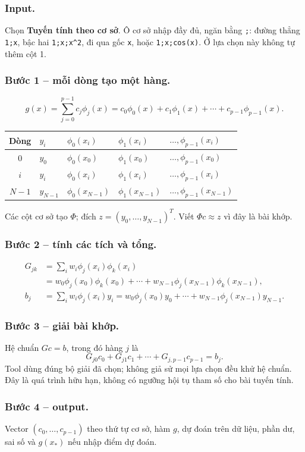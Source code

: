 \subsubsection*{Input.} Chọn \textbf{Tuyến tính theo cơ sở}. Ô cơ sở nhập đầy đủ, ngăn bằng \texttt{;}: đường thẳng \texttt{1;x}, bậc hai \texttt{1;x;x\^{}2}, đi qua gốc \texttt{x}, hoặc \texttt{1;x;cos(x)}. Ở lựa chọn này không tự thêm cột 1.
\subsubsection*{Bước 1 -- mỗi dòng tạo một hàng.}
\[
g(x)=\sum_{j=0}^{p-1}c_j\phi_j(x)=c_0\phi_0(x)+c_1\phi_1(x)+\cdots+c_{p-1}\phi_{p-1}(x).
\]
\begin{center}\small\begin{tabular}{cllll}\toprule
Dòng&$y_i$&$\phi_0(x_i)$&$\phi_1(x_i)$&$\ldots,\phi_{p-1}(x_i)$\\\midrule
0&$y_0$&$\phi_0(x_0)$&$\phi_1(x_0)$&$\ldots,\phi_{p-1}(x_0)$\\
$i$&$y_i$&$\phi_0(x_i)$&$\phi_1(x_i)$&$\ldots,\phi_{p-1}(x_i)$\\
$N-1$&$y_{N-1}$&$\phi_0(x_{N-1})$&$\phi_1(x_{N-1})$&$\ldots,\phi_{p-1}(x_{N-1})$\\\bottomrule
\end{tabular}\end{center}
Các cột cơ sở tạo $\Phi$; đích $z=(y_0,\ldots,y_{N-1})^T$. Viết $\Phi c\approx z$ vì đây là bài khớp.
\subsubsection*{Bước 2 -- tính các tích và tổng.}
\begin{align*}
G_{jk}&=\sum_iw_i\phi_j(x_i)\phi_k(x_i)\\
 &=w_0\phi_j(x_0)\phi_k(x_0)+\cdots+w_{N-1}\phi_j(x_{N-1})\phi_k(x_{N-1}),\\
b_j&=\sum_iw_i\phi_j(x_i)y_i=w_0\phi_j(x_0)y_0+\cdots+w_{N-1}\phi_j(x_{N-1})y_{N-1}.
\end{align*}
\subsubsection*{Bước 3 -- giải bài khớp.} Hệ chuẩn $Gc=b$, trong đó hàng $j$ là
\[
G_{j0}c_0+G_{j1}c_1+\cdots+G_{j,p-1}c_{p-1}=b_j.
\]
Tool dùng đúng bộ giải đã chọn; không giả sử mọi lựa chọn đều khử hệ chuẩn. Đây là quá trình hữu hạn, không có ngưỡng hội tụ tham số cho bài tuyến tính.
\subsubsection*{Bước 4 -- output.} Vector $(c_0,\ldots,c_{p-1})$ theo thứ tự cơ sở, hàm $g$, dự đoán trên dữ liệu, phần dư, sai số và $g(x_*)$ nếu nhập điểm dự đoán.

